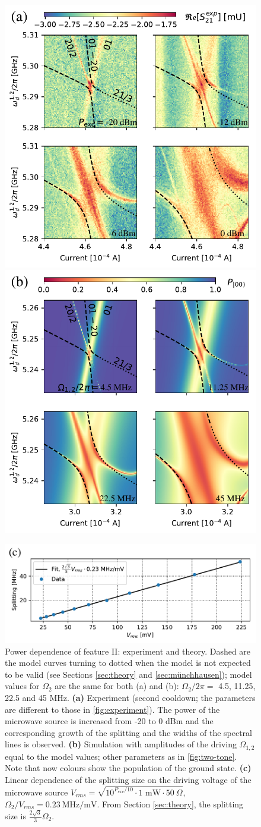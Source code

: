 \documentclass[%
 prx,
 amsmath,amssymb,
 reprint,%
]{revtex4-1}
\begin{document}
\begin{figure}
	\includegraphics[width=.49\linewidth]{powerscan}
	\includegraphics[width=.49\linewidth]{zoom2_picture}
	
	\includegraphics[width=.7\linewidth]{powerscan_1d}
	\caption{Power dependence of feature II: experiment and theory. Dashed are the model curves turning to dotted when the model is not expected to be valid (see Sections \ref{sec:theory} and \ref{sec:münchhausen}); model values for $\Omega_2$ are the same for both (a) and (b): $\Omega_{2}/2\pi=$ 4.5, 11.25, 22.5 and 45 MHz. \qquad	\textbf{(a)} Experiment (second cooldown; the parameters are different to those in \autoref{fig:experiment}). The power of the microwave source is increased from -20 to 0 dBm and the corresponding growth of the splitting and the widths of the spectral lines is observed. \textbf{(b)} Simulation with amplitudes of the driving $\Omega_{1,2}$ equal to the model values; other parameters as in \autoref{fig:two-tone}. Note that now colours show the population of the ground state. \textbf{(c)} Linear dependence of the splitting size on the driving voltage of the microwave source $V_{rms} = \sqrt{10^{P_{exc}/10}\cdot 1 \text{ mW} \cdot 50\ \Omega}$, ${\Omega_2}/{V_{rms}} = 0.23\ {\text{MHz}}/{\text{mV}}$. From Section \ref{sec:theory}, the splitting size is $\frac{2\sqrt{3}}{3} \Omega_2$.}
	\label{fig:zoom}
\end{figure}
\end{document}
